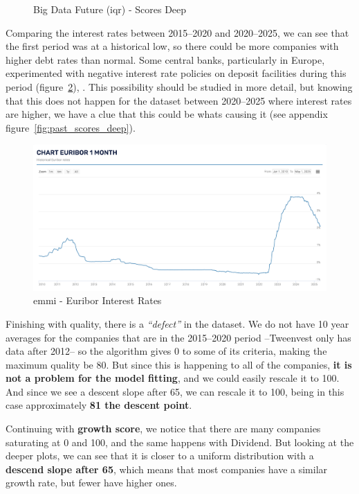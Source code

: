 \documentclass[11pt,english,a4paper,hidelinks]{book}
\begin{document}
\begin{figure}[H]
\begin{minipage}{0.5\textwidth}
        \caption{Big Data Future (\acrshort{iqr}) - Scores Deep}
        \label{fig:scores_deep}
    \end{minipage}
\end{figure}

\noindent Comparing the interest rates between 2015--2020 and 2020--2025, we can see that the first period was at a historical low, so there could be more companies with higher debt rates than normal. Some central banks, particularly in Europe, experimented with negative interest rate policies on deposit facilities during this period (figure~\ref{fig:euribor}), \cite{euribor_emmi}. This possibility should be studied in more detail, but knowing that this does not happen for the dataset between 2020--2025 where interest rates are higher, we have a clue that this could be whats causing it (see appendix figure~\ref{fig:past_scores_deep}).

\begin{figure}[H]
    \centering
    \includegraphics[width=1\linewidth]{images/macros/Euribor.png}
    \caption{\acrshort{emmi} - Euribor Interest Rates}
    \label{fig:euribor}
\end{figure}


\vspace{0.5cm}
\noindent Finishing with quality, there is a \textit{``defect''} in the dataset. We do not have 10 year averages for the companies that are in the 2015--2020 period --Tweenvest only has data after 2012-- so the algorithm gives 0 to some of its criteria, making the maximum quality be 80. But since this is happening to all of the companies, \textbf{it is not a problem for the model fitting}, and we could easily rescale it to 100. And since we see a descent slope after 65, we can rescale it to 100, being in this case approximately \textbf{81 the descent point}.

\vspace{0.5cm}
\noindent Continuing with \textbf{growth score}, we notice that there are many companies saturating at 0 and 100, and the same happens with Dividend. But looking at the deeper plots, we can see that it is closer to a uniform distribution with a \textbf{descend slope after 65}, which means that most companies have a similar growth rate, but fewer have higher ones.
\end{document}

